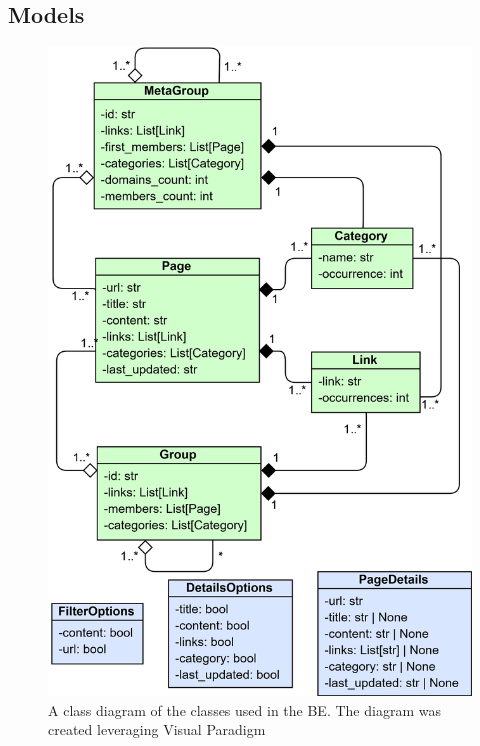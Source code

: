 \subsection{Models} \label{dixModels}
\begin{figure}[ht!]
  \centering
  \includegraphics[height=0.85\textheight]{Images/BEmodelsDiagram.png}
  \caption{A class diagram of the classes used in the BE. The diagram was created leveraging Visual Paradigm \cite{visualParadigm}}
  \label{BEmodelsDiagram}
\end{figure}
\FloatBarrier 
